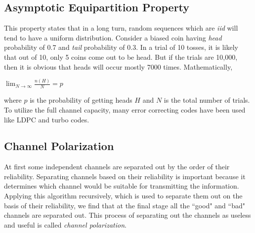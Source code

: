\documentclass[twocolumn]{report}
\begin{document}
\subsection{Asymptotic Equipartition Property}
This property states that in a long turn, random sequences which are \textit{iid} will tend to have a uniform distribution. Consider a biased coin having \textit{head} probability of 0.7 and \textit{tail} probability of 0.3. In a trial of 10 tosses, it is likely that out of 10, only 5 coins come out to be head. But if the trials are 10,000, then it is obvious that heads will occur mostly 7000 times. Mathematically,
\begin{center}
$ \displaystyle \lim_{N \rightarrow \infty}\frac{n(H)}{N} =p $
\end{center}
where $p$ is the probability of getting heads $H$ and $N$ is the total number of trials. To utilize the full channel capacity, many error correcting codes have been used like LDPC and turbo codes.

\subsection{Channel Polarization}
At first some independent channels are separated out by the order of their reliability. Separating channels based on their reliability is important because it determines which channel would be suitable for transmitting the information. Applying this algorithm recursively, which is used to separate them out on the basis of their reliability, we find that at the final stage all the ``good" and ``bad" channels are separated out. This process of separating out the channels as useless and useful is called \textit{channel polarization}.
\end{document}
